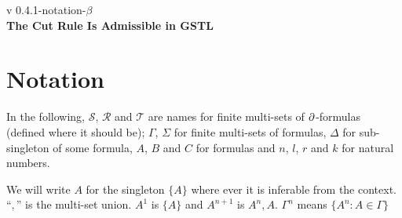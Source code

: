 \documentclass[a4paper, 12pt]{paper}
\begin{document}
{\noindent
	v 0.4.1-notation-$\beta$ \\
{\large\textbf{The Cut Rule Is Admissible in GSTL}}
}
\\
\setcounter{section}{-1}
\section{Notation} In the following, $\mathcal{S}$, $\mathcal{R}$ and $\mathcal{T}$ are names for finite multi-sets of $\partial$-formulas (defined where it should be); $\Gamma$, $\Sigma$ for finite multi-sets of formulas, $\Delta$ for sub-singleton of some formula, $A$, $B$ and $C$ for formulas and $n$, $l$, $r$ and $k$ for natural numbers.

We will write $A$ for the singleton $\{A\}$ where ever it is inferable from the context.
``$,$'' is the multi-set union.
$A^1$ is $\{A\}$ and $A^{n+1}$ is $A^n, A$. $\Gamma^n$ means $\{ A^n : A \in \Gamma \}$







\end{document}
